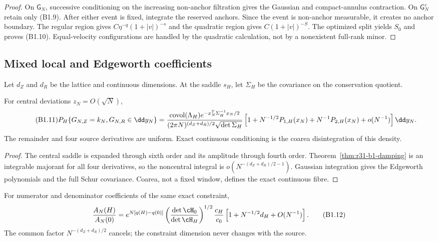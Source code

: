 \begin{proof}
On $\mathsf G_N$, successive conditioning on the increasing non-anchor
filtration gives the Gaussian and compact-annulus contraction.  On
$\mathsf G_N^c$ retain only (B1.9).  After either event is fixed, integrate the
reserved anchors.  Since the event is non-anchor measurable, it creates no
anchor boundary.  The regular region gives
$C\eta^{-q}(1+|v|)^{-s}$ and the quadratic region gives
$C(1+|v|)^{-S}$.  The optimized split yields $S_0$ and proves (B1.10).
Equal-velocity configurations are handled by the quadratic calculation, not
by a nonexistent full-rank minor.
\end{proof}

\subsection{Mixed local and Edgeworth coefficients}

Let $d_Z$ and $d_R$ be the lattice and continuous dimensions.  At the saddle
$s_H$, let $\Sigma_H$ be the covariance on the conservation quotient.

\begin{theorem}
\label{thm:r31-b1-edgeworth}
For central deviations $z_N=O(\sqrt N)$,
\begin{equation}\tag{B1.11}
 P_H\{G_{N,Z}=k_N,G_{N,R}\in\dd y_N\}
 ={\operatorname{covol}(\Lambda_H)
 e^{-x_N^T\Sigma_H^{-1}x_N/2}
  \over(2\pi N)^{(d_Z+d_R)/2}\sqrt{\det\Sigma_H}}
 \left[1+N^{-1/2}P_{1,H}(x_N)+N^{-1}P_{2,H}(x_N)
 +o(N^{-1})\right]\dd y_N.
\end{equation}
The remainder and four source derivatives are uniform.  Exact continuous
conditioning is the coarea disintegration of this density.
\end{theorem}

\begin{proof}
The central saddle is expanded through sixth order and its amplitude through
fourth order.  Theorem~\ref{thm:r31-b1-damping} is an integrable majorant for
all four derivatives, so the noncentral integral is
$o(N^{-(d_Z+d_R)/2-1})$.  Gaussian integration gives the Edgeworth
polynomials and the full Schur covariance.  Coarea, not a fixed window,
defines the exact continuous fibre.
\end{proof}

\begin{theorem}
\label{thm:r31-b1-ratio}
For numerator and denominator coefficients of the same exact constraint,
\[
 {A_N(H)\over A_N(0)}
 =e^{N[q(H)-q(0)]}
  \left({\det\cH_0\over\det\cH_H}\right)^{1/2}
  {c_H\over c_0}\left[1+N^{-1/2}d_H+O(N^{-1})\right].      \tag{B1.12}
\]
The common factor $N^{-(d_Z+d_R)/2}$ cancels; the constraint dimension never
changes with the source.
\end{theorem}

